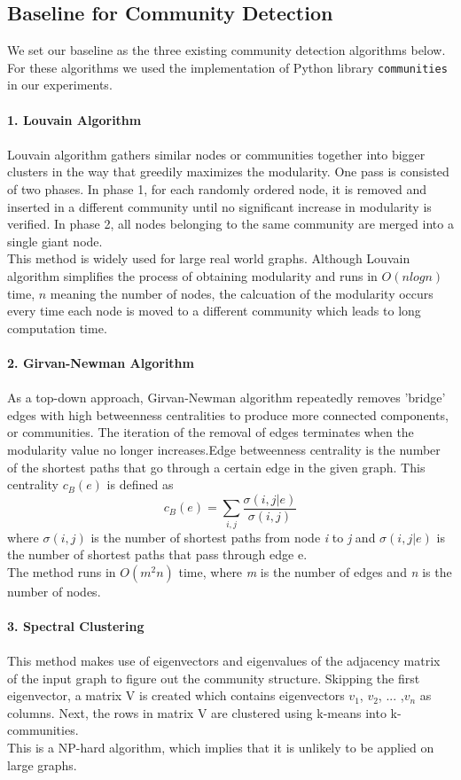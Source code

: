 \subsection{Baseline for Community Detection}
We set our baseline as the three existing community detection algorithms below. For these algorithms we used the implementation of Python library \texttt{communities} in our experiments. \\ \\
\textbf{1. Louvain Algorithm}\\ \\
Louvain algorithm gathers similar nodes or communities together into bigger clusters in the way that greedily maximizes the modularity. One pass is consisted of two phases. In phase 1, for each randomly ordered node, it is removed and inserted in a different community until no significant increase in modularity is verified. In phase 2, all nodes belonging to the same community are merged into a single giant node. \\
This method is widely used for large real world graphs. Although Louvain algorithm simplifies the process of obtaining modularity and runs in $O(nlogn)$ time, $n$ meaning the number of nodes, the calcuation of the modularity occurs every time each node is moved to a different community which leads to long computation time.\\ \\
\textbf{2. Girvan-Newman Algorithm}\\ \\
As a top-down approach, Girvan-Newman algorithm repeatedly removes 'bridge' edges with high betweenness centralities to produce more connected components, or communities. The iteration of the removal of edges terminates when the modularity value no longer increases.Edge betweenness centrality is the number of the shortest paths that go through a certain edge in the given graph. This centrality $c_{B}(e)$  is defined as \[ c_{B}(e) =  \sum_{i,j}^{}  \frac{ \sigma (i,j | e)}{\sigma(i,j)} \] where $\sigma (i,j)$ is the number of shortest paths from node \textit{i} to \textit{j} and $\sigma (i,j | e)$ is the number of shortest paths that pass through edge e.\\
The method runs in $O(m^{2}n)$ time, where \textit{m} is the number of edges and \textit{n} is the number of nodes.\\ \\
\textbf{3. Spectral Clustering}\\ \\
This method makes use of eigenvectors and eigenvalues of the adjacency matrix of the input graph to figure out the community structure. Skipping the first eigenvector, a matrix V is created which contains eigenvectors $v_{1}$, $v_{2}$, ... ,$v_{n}$ as columns. Next, the rows in matrix V are clustered using k-means into k-communities. \\
This is a NP-hard algorithm, which implies that it is unlikely to be applied on large graphs.\\

